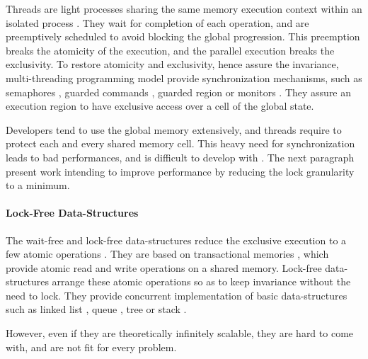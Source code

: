 Threads are light processes sharing the same memory execution context within an isolated process \cite{Dijkstra1968}.
They wait for completion of each operation, and are preemptively scheduled to avoid blocking the global progression.
This preemption breaks the atomicity of the execution, and the parallel execution breaks the exclusivity.
To restore atomicity and exclusivity, hence assure the invariance, multi-threading programming model provide synchronization mechanisms, such as semaphores \cite{Dijkstra}, guarded commands \cite{Dijkstra1975}, guarded region \cite{Hansen1978a} or monitors \cite{Hoare1974}.
They assure an execution region to have exclusive access over a cell of the global state.


Developers tend to use the global memory extensively, and threads require to protect each and every shared memory cell.
This heavy need for synchronization leads to bad performances, and is difficult to develop with \cite{Adya2002}.
The next paragraph present work intending to improve performance by reducing the lock granularity to a minimum.

\paragraph{Lock-Free Data-Structures}

The wait-free and lock-free data-structures reduce the exclusive execution to a few atomic operations \cite{Lamport1977,Herlihy1988,Herlihy1990,Herlihy1991,Anderson1990}.
They are based on transactional memories \cite{Harris2010}, which provide atomic read and write operations on a shared memory.
Lock-free data-structures arrange these atomic operations so as to keep invariance without the need to lock.
They provide concurrent implementation of basic data-structures such as linked list \cite{Valois1995,Timnat2012}, queue \cite{Sundell2003,Wimmer2015}, tree \cite{Ramachandran2015} or stack \cite{Hendler2004}.

However, even if they are theoretically infinitely scalable, they are hard to come with, and are not fit for every problem.


